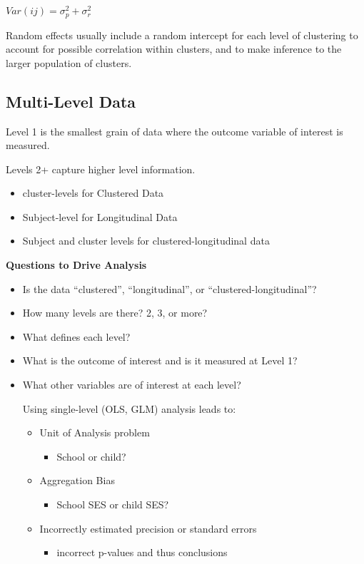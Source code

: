\documentclass[11pt]{article}
\begin{document}
\(Var(ij) = \sigma_p^2 + \sigma_r^2\)

Random effects usually include a random intercept for each level of clustering
to account for possible correlation within clusters, and to make inference to
the larger population of clusters.
\subsection{Multi-Level Data}
\label{sec:orgf0c5338}

Level 1 is the smallest grain of data where the outcome variable of interest is
measured.

Levels 2+ capture higher level information.
\begin{itemize}
\item cluster-levels for Clustered Data
\item Subject-level for Longitudinal Data
\item Subject and cluster levels for clustered-longitudinal data
\end{itemize}

\textbf{Questions to Drive Analysis}
\begin{itemize}
\item Is the data ``clustered'', ``longitudinal'', or ``clustered-longitudinal''?
\item How many levels are there? 2, 3, or more?
\item What defines each level?
\item What is the outcome of interest and is it measured at Level 1?
\item What other variables are of interest at each level?

Using single-level (OLS, GLM) analysis leads to:
\begin{itemize}
\item Unit of Analysis problem
\begin{itemize}
\item School or child?
\end{itemize}
\item Aggregation Bias
\begin{itemize}
\item School SES or child SES?
\end{itemize}
\item Incorrectly estimated precision or standard errors
\begin{itemize}
\item incorrect p-values and thus conclusions
\end{itemize}
\end{itemize}
\end{itemize}
\end{document}

